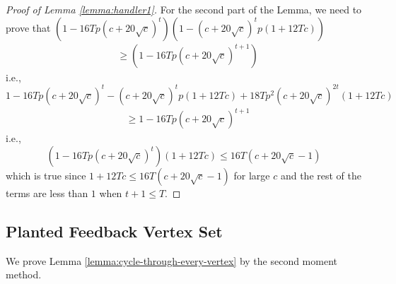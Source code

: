 \documentclass[11pt]{article}
\begin{document}
\begin{proof} [Proof of Lemma \ref{lemma:handler1}]
For the second part of the Lemma, we need to prove that
$\left(1-16Tp(c+20\sqrt{c})^t\right)(1-(c+20\sqrt{c})^tp(1+12Tc))$
\begin{align*}
&\geq \left(1-16Tp(c+20\sqrt{c})^{t+1}\right)
\end{align*}
i.e., $1-16Tp(c+20\sqrt{c})^t-(c+20\sqrt{c})^tp(1+12Tc)+18Tp^2(c+20\sqrt{c})^{2t}(1+12Tc)$
\begin{align*}
&\geq 1-16Tp(c+20\sqrt{c})^{t+1}
\end{align*}
i.e.,
\[
(1-16Tp(c+20\sqrt{c})^t)(1+12Tc)\leq 16T(c+20\sqrt{c}-1)
\]
which is true since $1+12Tc\leq 16T(c+20\sqrt{c}-1)$ for large $c$ and the rest of the terms are less than $1$ when $t+1\leq T$.

\end{proof}

\subsection{Planted Feedback Vertex Set}
We prove Lemma \ref{lemma:cycle-through-every-vertex} by the second moment method.
\end{document}
